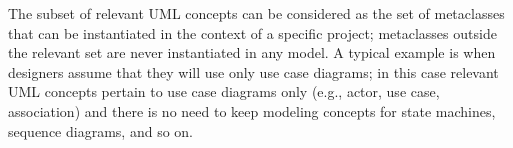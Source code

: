 The subset of relevant UML concepts can be considered as the set of metaclasses that can be instantiated
in the context of a specific project; metaclasses outside the relevant set are never instantiated in any model.
A typical example is when designers assume that they will use only use case diagrams; 
in this case relevant UML concepts pertain to use case diagrams only (e.g., actor, use case, association) 
and there is no need to keep modeling concepts for state machines, sequence diagrams, and so on.
%

